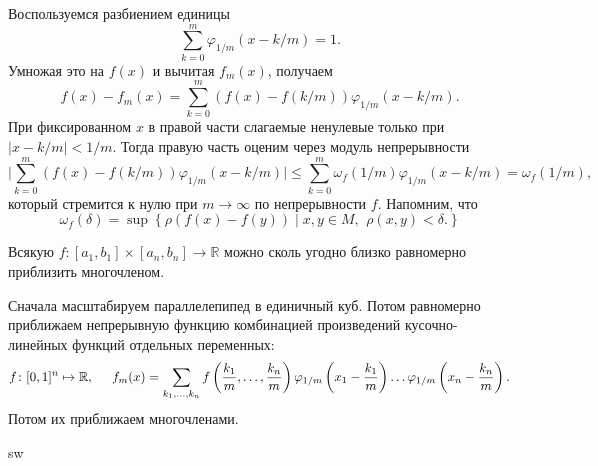 \begin{uproof}
Воспользуемся разбиением единицы
\begin{equation*}
    \sum_{k=0}^{m} \varphi_{1/m} (x - k/m) = 1.
\end{equation*}
Умножая это на $f(x)$ и вычитая $f_m(x)$, получаем
\begin{equation*}
    f(x) - f_m (x) = \sum_{k=0}^{m}  \left(
        f(x)- f(k/m)
    \right) \varphi_{1/m} (x-k/m).
\end{equation*}
При фиксированном $x$ в правой части слагаемые ненулевые только при $|x-k/m|<1/m$. Тогда правую часть оценим через модуль непрерывности 
\begin{equation*}
    \bigg| \sum_{k=0}^{m}  \left(
        f(x)- f(k/m)
    \right) \varphi_{1/m} (x-k/m) \bigg| \leq 
    \sum_{k=0}^{m}  \omega_f (1/m) \varphi_{1/m} (x-k/m) = \omega_f (1/m),
\end{equation*}
который стремится к нулю при $m \to \infty$ по непрерывности $f$. Напомним, что
\begin{equation*}
    \omega_f (\delta) = \sup \left\{
        \rho(f(x) - f(y)) \mid x, y \in M,\, \ \rho(x, y) < \delta.
    \right\}
\end{equation*}


\end{uproof}


\begin{to_thr}
    Всякую $f \colon [a_1, b_1] \times [a_n, b_n] \to \mathbb{R}$ можно сколь угодно близко
равномерно приблизить многочленом.
\end{to_thr}


\begin{uproof}
    Сначала масштабируем параллелепипед в единичный куб. Потом равномерно приближаем непрерывную функцию комбинацией произведений кусочно-линейных функций отдельных переменных:
\begin{equation*}
    f \colon  [0, 1]^n \mapsto \mathbb{R}, \hspace{5 mm} 
    f_m (x) = \sum_{k_1, \ldots, k_n} f\left(
        \frac{k_1}{m}, \ldots, \frac{k_n}{m}
    \right) \varphi_{1/m}\left(x_1 -\frac{k_1}{m}\right) \ldots \varphi_{1/m} \left(x_n - \frac{k_n}{m}\right).
\end{equation*}
     Потом их приближаем многочленами. 
\end{uproof}sw